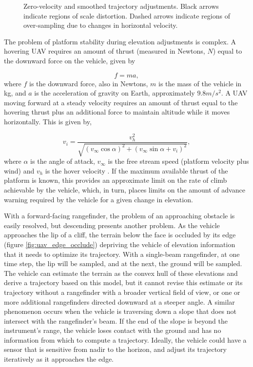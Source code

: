\documentclass[10pt]{article}
\begin{document}
\begin{figure}
\centering
\def\svgscale{0.5}

\caption{Zero-velocity and smoothed trajectory adjustments. Black arrows indicate regions of scale distortion. Dashed arrows indicate regions of over-sampling due to changes in horizontal velocity.}
\label{fig:uav_smooth_traj}
\end{figure}

The problem of platform stability during elevation adjustments is complex. A hovering UAV requires an amount of thrust (measured in Newtons, $N$) equal to the downward force on the vehicle, given by

\begin{equation}
f = ma,
\label{eq:hover_force}
\end{equation} where $f$ is the downward force, also in Newtons, $m$ is the mass of the vehicle in kg, and $a$ is the acceleration of gravity on Earth, approximately $9.8m/s^2$. A UAV moving forward at a steady velocity requires an amount of thrust equal to the hovering thrust plus an additional force to maintain altitude while it moves horizontally. This is given by,
 
\begin{equation}
v_i = \dfrac{ v_h^2 } { \sqrt{ (v_\infty \cos \alpha)^2 + (v_\infty \sin \alpha + v_i)^2 } } ,
\label{eq:move_force}
\end{equation} where $\alpha$ is the angle of attack, $v_\infty$ is the free stream speed (platform velocity plus wind) and $v_h$ is the hover velocity \cite{Hoffmann2007}. If the maximum available thrust of the platform is known, this provides an approximate limit on the rate of climb achievable by the vehicle, which, in turn, places limits on the amount of advance warning required by the vehicle for a given change in elevation. 

With a forward-facing rangefinder, the problem of an approaching obstacle is easily resolved, but descending presents another problem. As the vehicle approaches the lip of a cliff, the terrain below the face is occluded by its edge (figure \ref{fig:uav_edge_occlude}) depriving the vehicle of elevation information that it needs to optimize its trajectory. With a single-beam rangefinder, at one time step, the lip will be sampled, and at the next, the ground will be sampled. The vehicle can estimate the terrain as the convex hull of these elevations and derive a trajectory based on this model, but it cannot revise this estimate or its trajectory without a rangefinder with a broader vertical field of view, or one or more additional rangefinders directed downward at a steeper angle. A similar phenomenon occurs when the vehicle is traversing down a slope that does not intersect with the rangefinder's beam. If the end of the slope is beyond the instrument's range, the vehicle loses contact with the ground and has no information from which to compute a trajectory.  Ideally, the vehicle could have a sensor that is sensitive from nadir to the horizon, and adjust its trajectory iteratively as it approaches the edge. 
\end{document}
